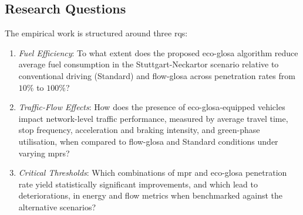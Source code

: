 \subsection{Research Questions}
\label{subsec:Research_Questions}
The empirical work is structured around three \acp{rq}:
\begin{enumerate}[label=RQ\arabic*, ref=RQ\arabic*]
  \item \label{rq1} \emph{Fuel Efficiency}: To what extent does the proposed \ac{eco-glosa} algorithm reduce average fuel consumption in the Stuttgart-Neckartor scenario relative to conventional driving (Standard) and \ac{flow-glosa} across penetration rates from $10\%$ to $100\%$?
  \item \label{rq2} \emph{Traffic-Flow Effects}: How does the presence of \ac{eco-glosa}-equipped vehicles impact network-level traffic performance, measured by average travel time, stop frequency, acceleration and braking intensity, and green-phase utilisation, when compared to \ac{flow-glosa} and Standard conditions under varying \acp{mpr}?
  \item \label{rq3} \emph{Critical Thresholds}: Which combinations of \ac{mpr} and \ac{eco-glosa} penetration rate yield statistically significant improvements, and which lead to deteriorations, in energy and flow metrics when benchmarked against the alternative scenarios?
\end{enumerate}